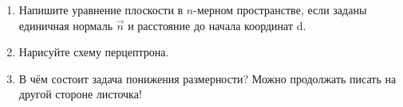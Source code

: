 \documentclass[a4paper,10pt]{article}
\begin{document}
\begin{enumerate}
	\item
	Напишите уравнение плоскости в $n$-мерном пространстве, если заданы единичная нормаль $\vec n$ и расстояние до начала координат d.
	\vspace{1cm}
	\item Нарисуйте схему перцептрона.
	\vspace{4cm}
	\item В чём состоит задача понижения размерности? Можно продолжать писать на другой стороне листочка!
	\vspace{4cm}

\end{enumerate}
\end{document}
